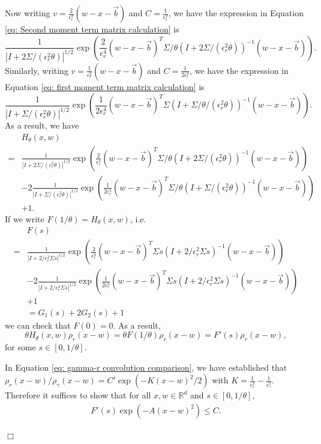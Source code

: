 \documentclass[12pt]{article}
\newenvironment {proof}{{\noindent\bf Proof }}{\hfill $\Box$ \medskip}
\newcommand{\meanq}{\vec b}    %
\newcommand{\covq}{\Sigma}     %
\begin{document}
\begin{proof}
Now writing $v=\frac{2}{\epsilon_r^2}( w-x-\meanq)$
and $C=\frac{1}{\epsilon_r^2}$,
we have the expression in Equation
\eqref{eq: Second moment term matrix calculation} is 
$$\frac{1}{|I+2\covq/(\epsilon_r^2\theta) |^{1/2}}
\exp 
\left(
\frac{2}{\epsilon_r^4}( w-x-\meanq)^{T}\covq/\theta\left(I+2\covq/(\epsilon_r^2\theta)\right)^{-1}( w-x-\meanq)
\right).$$
Similarly, writing $v=\frac{1}{\epsilon_r^2}( w-x-\meanq)$
and $C=\frac{1}{2\epsilon_r^2}$,
we have the expression in Equation
\eqref{eq: first moment term matrix calculation} is 
$$\frac{1}{|I+\covq/(\epsilon_r^2\theta) |^{1/2}}
\exp 
\left(
\frac{1}{2\epsilon_r^4}( w-x-\meanq)^{T}\covq\left(I+\covq/\theta/(\epsilon_r^2\theta)\right)^{-1}( w-x-\meanq)
\right).$$
As a result, we have 
\begin{align*}
&H_{\theta}(x,w)\\
=& \frac{1}{|I+2\covq/(\epsilon_r^2\theta) |^{1/2}}
\exp 
\left(
\frac{2}{\epsilon_r^4}( w-x-\meanq)^{T}\covq/\theta\left(I+2\covq/(\epsilon_r^2\theta)\right)^{-1}( w-x-\meanq)
\right)\\
&-2\frac{1}{|I+\covq/(\epsilon_r^2\theta) |^{1/2}}
\exp 
\left(
\frac{1}{2\epsilon_r^4}( w-x-\meanq)^{T}\covq/\theta\left(I+\covq/(\epsilon_r^2\theta)\right)^{-1}( w-x-\meanq)
\right)\\
&+1.
\end{align*}
If we write $F(1/\theta)=H_{\theta}(x,w)$, i.e.
\begin{align*}
&F(s)\\
=& \frac{1}{|I+2/\epsilon_r^2 \covq s |^{1/2}}
\exp 
\left(
\frac{2}{\epsilon_r^4}( w-x-\meanq)^{T}\covq s \left(I+2/\epsilon_r^2 \covq s\right)^{-1}( w-x-\meanq)
\right)\\
&-2\frac{1}{|I+2/\epsilon_r^2 \covq s |^{1/2}}
\exp 
\left(
\frac{1}{2\epsilon_r^4}( w-x-\meanq)^{T}\covq s \left(I+2/\epsilon_r^2 \covq s\right)^{-1}( w-x-\meanq)
\right)\\
&+1\\
&=G_1(s)+2G_2(s)+1
\end{align*}
we can check that $F(0)=0$.
As a result, 
$$\theta H_{\theta}(x,w)\rho_r(x-w)= \theta F(1/\theta)\rho_r(x-w)=F'(s)\rho_r(x-w),$$
for some $s \in [0, 1/\theta]$.

In Equation \eqref{eq: gamma-r convolution comparison}, we have established that 
$\rho_r(x-w) / \rho_\gamma(x-w) = C' \exp(-K (x-w)^2 / 2)$
with $K = \frac{1}{\epsilon_r^2} - \frac{1}{\epsilon_\gamma^2}$.
Therefore it suffices to show that for all $x,w \in \mathbb{R}^d$ and $s \in [0, 1/\theta]$, 
\begin{align} 
    F'(s) \exp\left(-A (x-w)^2 \right) \le C .
\end{align}


\end{proof}
\end{document}
